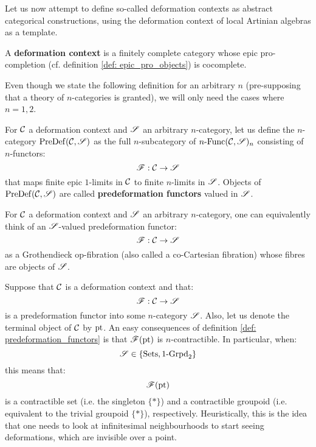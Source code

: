         Let us now attempt to define so-called deformation contexts as abstract categorical constructions, using the deformation context of local Artinian algebras as a template.
        \begin{definition} \label{def: deformation_context}
            A \textbf{deformation context} is a finitely complete category whose epic pro-completion (cf. definition \ref{def: epic_pro_objects}) is cocomplete. 
        \end{definition}
        Even though we state the following definition for an arbitrary $n$ (pre-supposing that a theory of $n$-categories is granted), we will only need the cases where $n = 1, 2$. 
        \begin{definition} \label{def: predeformation_functors}
            For $\mathcal{C}$ a deformation context and $\mathscr{S}$ an arbitrary $n$-category, let us define the $n$-category $\mathrm{Pre}\mathrm{Def}(\mathcal{C}, \mathscr{S})$ as the full $n$-subcategory of $n\text{-}\mathrm{Func}(\mathcal{C}, \mathscr{S})_n$ consisting of $n$-functors:
                $$\mathscr{F}: \mathcal{C} \to \mathscr{S}$$
            that maps finite epic $1$-limits in $\mathcal{C}$ to finite $n$-limits in $\mathscr{S}$. Objects of $\mathrm{Pre}\mathrm{Def}(\mathcal{C}, \mathscr{S})$ are called \textbf{predeformation functors} valued in $\mathscr{S}$. 
        \end{definition}
        \begin{remark}
            For $\mathcal{C}$ a deformation context and $\mathscr{S}$ an arbitrary $n$-category, one can equivalently think of an $\mathscr{S}$-valued predeformation functor:
                $$\mathscr{F}: \mathcal{C} \to \mathscr{S}$$
            as a Grothendieck op-fibration (also called a co-Cartesian fibration) whose fibres are objects of $\mathscr{S}$. 
        \end{remark}
        \begin{remark}
            Suppose that $\mathcal{C}$ is a deformation context and that:
                $$\mathscr{F}: \mathcal{C} \to \mathscr{S}$$
            is a predeformation functor into some $n$-category $\mathscr{S}$. Also, let us denote the terminal object of $\mathcal{C}$ by $\mathrm{pt}$. An easy consequences of definition \ref{def: predeformation_functors} is that $\mathscr{F}(\mathrm{pt})$ is $n$-contractible. In particular, when:
                $$\mathscr{S} \in \{\mathrm{Sets}, 1\text{-}\mathrm{Grpd}_2\}$$
            this means that:
                $$\mathscr{F}(\mathrm{pt})$$
            is a contractible set (i.e. the singleton $\{*\}$) and a contractible groupoid (i.e. equivalent to the trivial groupoid $\{*\}$), respectively. Heuristically, this is the idea that one needs to look at infinitesimal neighbourhoods to start seeing deformations, which are invisible over a point.
        \end{remark}
